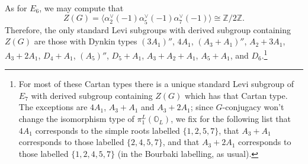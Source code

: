 \documentclass[11pt]{amsart}
\renewcommand{\O}{{\mathbb O}}
\newcommand{\bZ}{{\mathbb Z}}
\numberwithin{equation}{section}
\begin{document}
	As for $E_6$, we may compute that $$Z(G)=\langle \alpha_2^\vee(-1)\alpha_5^\vee(-1)\alpha_7^\vee(-1)\rangle\cong \bZ/2\bZ.$$ Therefore, the only standard Levi subgroups with derived subgroup containing $Z(G)$ are those with Dynkin types $(3A_1)''$, $4A_1$, $(A_3+A_1)''$, $A_2+3A_1$, $A_3+2A_1$, $D_4+A_1$, $(A_5)''$, $D_5+A_1$, $A_3+A_2+A_1$, $A_5+A_1$, and $D_6$.\footnote{For most of these Cartan types there is a unique standard Levi subgroup of $E_7$ with derived subgroup containing $Z(G)$ which has that Cartan type. The exceptions are $4A_1$, $A_3+A_1$ and $A_3+2A_1$; since $G$-conjugacy won't change the isomorphism type of $\pi_1^L(\O_L)$, we fix for the following list that $4A_1$ corresponds to the simple roots labelled $\{1,2,5,7\}$, that $A_3+A_1$ corresponds to those labelled $\{2,4,5,7\}$, and that $A_3+2A_1$ corresponds to those labelled $\{1,2,4,5,7\}$ (in the Bourbaki labelling, as usual).}
	
\end{document}
